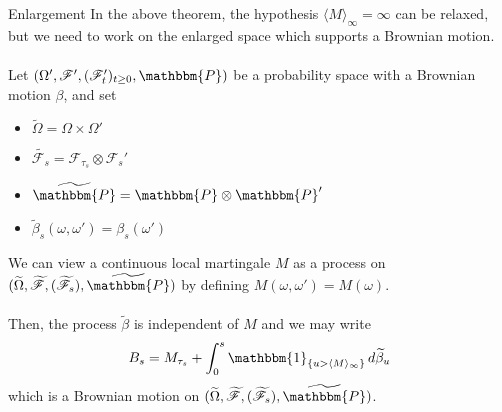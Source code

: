 \documentclass[12pt,a4paper]{article}
\begin{document}
    \begin{remark}{Enlargement}{}
        In the above theorem, the hypothesis $\langle M\rangle_\infty = \infty$ can be relaxed, but we need to work on the enlarged space which supports a Brownian motion.\\
        \\
        Let $(\Omega', \mathscr{F}', (\mathscr{F}'_t)_{t\ge 0}, \mathbbm{P})$ be a probability space with a Brownian motion $\beta$, and set 
        \begin{itemize}
            \item $\widetilde{\Omega} = \Omega\times\Omega'$
            \item $\widetilde{\mathscr{F}_s} = \mathscr{F}_{\tau_s} \otimes \mathscr{F}_s'$
            \item $\widetilde{\mathbbm{P}} = \mathbbm{P}\otimes\mathbbm{P}'$
            \item $\widetilde{\beta}_s(\omega,\omega') = \beta_s (\omega')$
        \end{itemize}
        We can view a continuous local martingale $M$ as a process on $(\widetilde{\Omega},\widetilde{\mathscr{F}}, (\widetilde{\mathscr{F}}_s), \widetilde{\mathbbm{P}})$ by defining $M(\omega,\omega') = M(\omega)$.\\
        \\
        Then, the process $\widetilde{\beta}$ is independent of $M$ and we may write
        $$
        B_s = M_{\tau_s}+\int_0^s \mathbbm{1}_{\{u>\langle M\rangle_\infty\}} \, d\widetilde{\beta}_u
        $$
        which is a Brownian motion on $(\widetilde{\Omega},\widetilde{\mathscr{F}}, (\widetilde{\mathscr{F}}_s), \widetilde{\mathbbm{P}})$.
    \end{remark}
    \pagebreak
\end{document}
